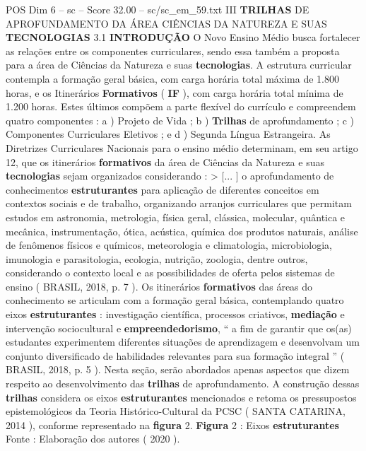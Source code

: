 \begin{textsample}{POS Dim 6 – sc – Score 32.00 – sc/sc\_em\_59.txt}  \label{ex:f6_pos_003}
III \textbf{TRILHAS} DE APROFUNDAMENTO DA ÁREA CIÊNCIAS DA NATUREZA E SUAS \textbf{TECNOLOGIAS} 3.1 \textbf{INTRODUÇÃO} O Novo Ensino Médio busca fortalecer as relações entre os componentes curriculares, sendo essa também a proposta para a área de Ciências da Natureza e suas \textbf{tecnologias}.
A estrutura curricular contempla a formação geral básica, com carga horária total máxima de 1.800 horas, e os Itinerários \textbf{Formativos} ( \textbf{IF} ), com carga horária total mínima de 1.200 horas.
Estes últimos compõem a parte flexível do currículo e compreendem quatro componentes : a ) Projeto de Vida ; b ) \textbf{Trilhas} de aprofundamento ; c ) Componentes Curriculares Eletivos ; e d ) Segunda Língua Estrangeira.
As Diretrizes Curriculares Nacionais para o ensino médio determinam, em seu artigo 12, que os itinerários \textbf{formativos} da área de Ciências da Natureza e suas \textbf{tecnologias} sejam organizados considerando : > [... ] o aprofundamento de conhecimentos \textbf{estruturantes} para aplicação de diferentes conceitos em contextos sociais e de trabalho, organizando arranjos curriculares que permitam estudos em astronomia, metrologia, física geral, clássica, molecular, quântica e mecânica, instrumentação, ótica, acústica, química dos produtos naturais, análise de fenômenos físicos e químicos, meteorologia e climatologia, microbiologia, imunologia e parasitologia, ecologia, nutrição, zoologia, dentre outros, considerando o contexto local e as possibilidades de oferta pelos sistemas de ensino ( BRASIL, 2018, p. 7 ).
Os itinerários \textbf{formativos} das áreas do conhecimento se articulam com a formação geral básica, contemplando quatro eixos \textbf{estruturantes} : investigação científica, processos criativos, \textbf{mediação} e intervenção sociocultural e \textbf{empreendedorismo}, “ a fim de garantir que os(as) estudantes experimentem diferentes situações de aprendizagem e desenvolvam um conjunto diversificado de habilidades relevantes para sua formação integral ” ( BRASIL, 2018, p. 5 ).
Nesta seção, serão abordados apenas aspectos que dizem respeito ao desenvolvimento das \textbf{trilhas} de aprofundamento.
A construção dessas \textbf{trilhas} considera os eixos \textbf{estruturantes} mencionados e retoma os pressupostos epistemológicos da Teoria Histórico-Cultural da PCSC ( SANTA CATARINA, 2014 ), conforme representado na \textbf{figura} 2. \textbf{Figura} 2 : Eixos \textbf{estruturantes} Fonte : Elaboração dos autores ( 2020 ).

\end{textsample}
